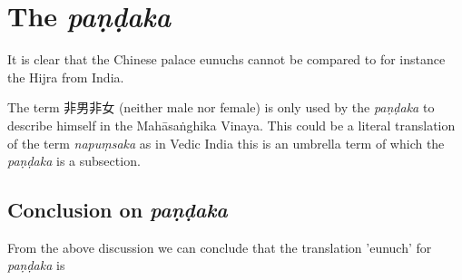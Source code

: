 \section{The {\em paṇḍaka}}



It is clear that the Chinese palace eunuchs cannot be compared to for instance the Hijra from India.

\begin{figure}[!tbp]
  \centering
  \hfill
\end{figure}

The term 非男非女 (neither male nor female) is only used by the {\em paṇḍaka} to describe himself in the Mahāsaṅghika Vinaya. This could be a literal translation of the term {\em napuṃsaka} as in Vedic India this is an umbrella term of which the {\em paṇḍaka} is a subsection. 

\subsection{Conclusion on {\em paṇḍaka}}
From the above discussion we can conclude that the translation 'eunuch' for {\em paṇḍaka} is 


